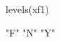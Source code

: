 \begin{Schunk}
\begin{Sinput}
  levels(xf1)
\end{Sinput}
\begin{Soutput}
[1] "F" "N" "Y"
\end{Soutput}
\end{Schunk}
